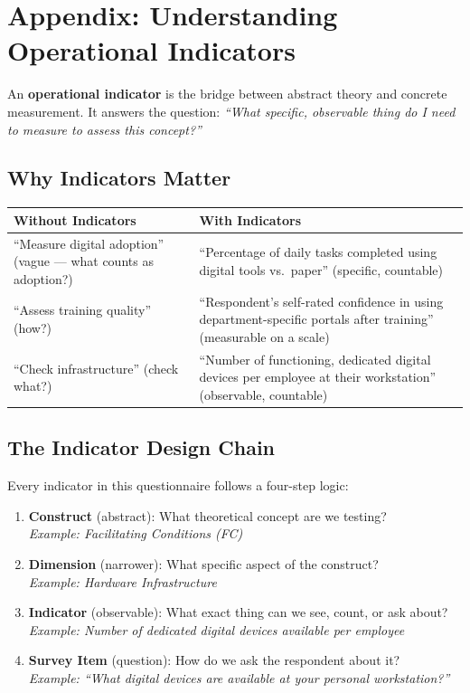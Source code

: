 \documentclass[11pt,a4paper]{article}
\begin{document}
\newpage
\section*{Appendix: Understanding Operational Indicators}

An \textbf{operational indicator} is the bridge between abstract theory and concrete measurement. It answers the question: \textit{``What specific, observable thing do I need to measure to assess this concept?''}

\subsection*{Why Indicators Matter}

\begin{table}[H]\centering\small
\begin{tabularx}{\textwidth}{L{3cm} X}
\toprule
\textbf{Without Indicators} & \textbf{With Indicators} \\
\midrule
``Measure digital adoption'' (vague --- what counts as adoption?) & ``Percentage of daily tasks completed using digital tools vs.\ paper'' (specific, countable) \\[4pt]
``Assess training quality'' (how?) & ``Respondent's self-rated confidence in using department-specific portals after training'' (measurable on a scale) \\[4pt]
``Check infrastructure'' (check what?) & ``Number of functioning, dedicated digital devices per employee at their workstation'' (observable, countable) \\
\bottomrule
\end{tabularx}
\end{table}

\subsection*{The Indicator Design Chain}

Every indicator in this questionnaire follows a four-step logic:

\begin{enumerate}[leftmargin=1.5em, itemsep=6pt]
    \item \textbf{Construct} (abstract): What theoretical concept are we testing? \\
    \textit{Example: Facilitating Conditions (FC)}
    \item \textbf{Dimension} (narrower): What specific aspect of the construct? \\
    \textit{Example: Hardware Infrastructure}
    \item \textbf{Indicator} (observable): What exact thing can we see, count, or ask about? \\
    \textit{Example: Number of dedicated digital devices available per employee}
    \item \textbf{Survey Item} (question): How do we ask the respondent about it? \\
    \textit{Example: ``What digital devices are available at your personal workstation?''}
\end{enumerate}
\end{document}
